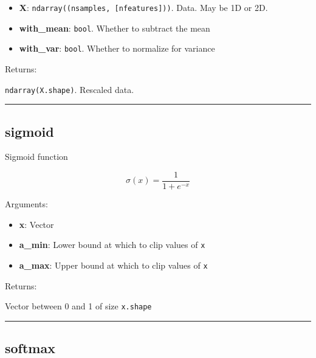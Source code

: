 \begin{itemize}
\tightlist
\item
  \textbf{X}: \texttt{ndarray((nsamples,\ {[}nfeatures{]}))}. Data. May
  be 1D or 2D.
\item
  \textbf{with\_mean}: \texttt{bool}. Whether to subtract the mean
\item
  \textbf{with\_var}: \texttt{bool}. Whether to normalize for variance
\end{itemize}

Returns:

\texttt{ndarray(X.shape)}. Rescaled data.

\begin{center}\rule{0.5\linewidth}{\linethickness}\end{center}

\subsection{sigmoid}\label{sigmoid}

\begin{Shaded}
\begin{Highlighting}[]
\OperatorTok{=-}\OperatorTok{=}\NormalTok{)}
\end{Highlighting}
\end{Shaded}

Sigmoid function

\[
\sigma(x) = \frac{1}{1 + e^{-x}}
\]

Arguments:

\begin{itemize}
\tightlist
\item
  \textbf{x}: Vector
\item
  \textbf{a\_min}: Lower bound at which to clip values of \texttt{x}
\item
  \textbf{a\_max}: Upper bound at which to clip values of \texttt{x}
\end{itemize}

Returns:

Vector between 0 and 1 of size \texttt{x.shape}

\begin{center}\rule{0.5\linewidth}{\linethickness}\end{center}

\subsection{softmax}\label{softmax}

